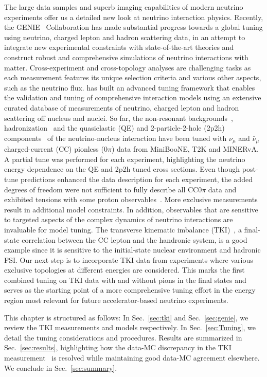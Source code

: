 The large data samples and superb imaging capabilities of modern neutrino experiments offer us a detailed new look at neutrino interaction physics.
Recently, the GENIE~\cite{Andreopoulos:2009rq, GENIE:2021npt} Collaboration has made substantial progress towards a global tuning using neutrino, charged lepton and hadron scattering data, in an attempt to integrate new experimental constraints with state-of-the-art theories and construct robust and comprehensive simulations of neutrino interactions with matter. 
Cross-experiment and cross-topology analyses are challenging tasks as each measurement features its unique selection criteria and various other  aspects, such as the neutrino flux. \genie has built an advanced tuning framework that enables the validation and tuning of comprehensive interaction models using an extensive curated database of measurements of neutrino, charged lepton and hadron scattering off nucleus and nuclei. So far, the non-resonant backgrounds~\cite{GENIE:2021zuu}, hadronization~\cite{GENIE:2021wox} and the quasielastic (QE) and 2-particle-2-hole (2p2h)  components~\cite{GENIE:2022qrc} of the neutrino-nucleus interaction have been tuned with $\nu_\mu$ and $\bar{\nu}_\mu$ charged-current (CC) pionless (0$\pi$) data from MiniBooNE, T2K and MINERvA. A partial tune was performed for each experiment, highlighting the neutrino energy dependence on the QE and 2p2h tuned cross sections. Even though post-tune predictions enhanced the data description for each experiment, the added degrees of freedom were not sufficient to fully describe all CC0$\pi$ data and exhibited tensions with some proton observables~\cite{GENIE:2022qrc}. More exclusive measurements result in additional model constraints. In addition, observables that are sensitive to targeted aspects of the complex dynamics of neutrino interactions are invaluable for model tuning. The transverse kinematic imbalance (TKI)~\cite{Lu:2015hea, Lu:2015tcr}, a final-state correlation between the CC lepton and the handronic system, is a good example since it is sensitive to the initial-state nuclear environment and hadronic FSI. Our next step is to incorporate TKI data from experiments where various exclusive topologies at different energies are considered. This marks the first combined tuning on TKI data with and without pions in the final states and serves as the starting point of a more comprehensive tuning effort in the energy region most relevant for future accelerator-based neutrino experiments.  



This chapter is structured as follows: In Sec.~\ref{sec:tki} and Sec.~\ref{sec:genie}, we review the TKI measurements and \genie models respectively. In Sec.~\ref{sec:Tuning}, we detail the tuning considerations and procedures. Results are summarized in Sec.~\ref{sec:results}, highlighting how the data-MC discrepancy in the \minpiz TKI measurement~\cite{MINERvA:2020anu} is resolved while maintaining good data-MC agreement elsewhere. We conclude in Sec.~\ref{sec:summary}. 

